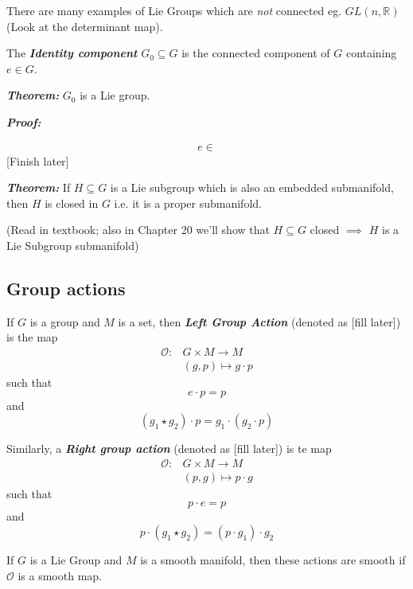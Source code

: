 \documentclass{article}
\newcommand{\R}{\mathbb{R}}
\begin{document}
\vskip 0.5cm
There are many examples of Lie Groups which are \emph{not} connected eg. $GL(n, \R)$ (Look at the determinant map).

\vskip 0.5cm
\begin{mathdefinitionbox}
  The \emph{\textbf{Identity component}} $G_0 \subseteq G$ is the connected component of $G$ containing $e \in G$.
\end{mathdefinitionbox}

\vskip 0.5cm
\begin{dottedbox}
  \emph{\textbf{Theorem:}} $G_0$ is a Lie group.
\end{dottedbox}

\emph{\textbf{Proof:}} 

\begin{align*}
  e \in 
\end{align*}
[Finish later]

\vskip 0.5cm
\begin{dottedbox}
  \emph{\textbf{Theorem:}} If $H \subseteq G$ is a Lie subgroup which is also an embedded submanifold, then $H$ is closed in $G$ i.e. it is a proper submanifold.
\end{dottedbox}

(Read in textbook; also in Chapter 20 we'll show that $H \subseteq G$ closed $\implies$ $H$ is a Lie Subgroup submanifold)

\vskip 1cm
\subsection{Group actions}

\vskip 0.5cm
\begin{mathdefinitionbox}{}
  If $G$ is a group and $M$ is a set, then \emph{\textbf{Left Group Action}} (denoted as [fill later]) is the map
  \begin{align*}
    \mathcal{O} : &G \times M \rightarrow M \\
    &(g, p) \mapsto g \cdot p
  \end{align*}
  such that 
  \[ e \cdot p = p \] and 
  \[ \left(g_1 \star g_2\right) \cdot p = g _1 \cdot \left(g_2 \cdot p\right)  \]

  \vskip 0.5cm
  Similarly, a \emph{\textbf{Right group action}} (denoted as [fill later]) is te map  
  \begin{align*}
    \mathcal{O} : &G \times M \rightarrow M \\
    &(p, g) \mapsto p \cdot g
  \end{align*}
  such that 
  \[ p \cdot e = p \] and 
  \[ p \cdot \left(g_1 \star g_2\right)  = \left(p \cdot g_1\right) \cdot g_2 \]

  \vskip 0.5cm
  If $G$ is a Lie Group and $M$ is a smooth manifold, then these actions are smooth if $\mathcal{O}$ is a smooth map.
\end{mathdefinitionbox}
\end{document}
